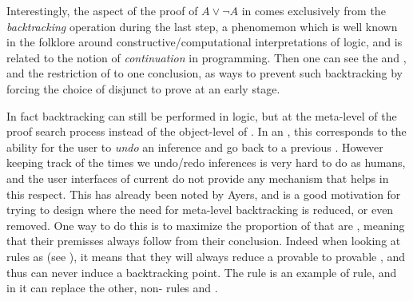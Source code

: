 \begin{scope}

Interestingly, the  aspect of the proof of $A \lor \neg A$ in
 comes exclusively from the \emph{backtracking} operation during
the last step, a phenomemon which is well known in the folklore around
constructive/computational interpretations of  logic, and is
related to the notion of \emph{continuation} in programming. Then one can see the
 {} and {}, and the restriction
of   to one conclusion, as ways to prevent such
backtracking by forcing the choice of disjunct to prove at an early stage.

In fact backtracking can still be performed in  logic, but at
the meta-level of the proof search process instead of the object-level of
. In an , this corresponds to
the ability for the user to \emph{undo} an inference and go back to a previous
. However keeping track of the times we undo/redo inferences is
very hard to do as humans, and the user interfaces of current  do not provide any mechanism that helps in this respect. This has
already been noted by Ayers, and is a good motivation for trying to design  where the need for meta-level backtracking is reduced, or even removed.
One way to do this is to maximize the proportion of  that
are \emph{}, meaning that their premisses always follow from
their conclusion. Indeed when looking at rules as  (see
), it means that they will always reduce a provable
 to provable , and thus can never induce a backtracking
point. The {} rule is an example of  rule, and
in  it can replace the other, non- rules {}
and {}.


\end{scope}
